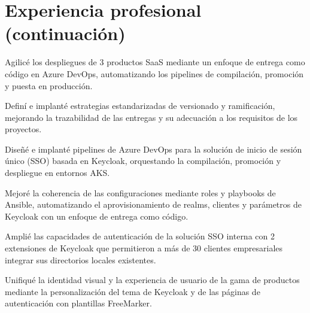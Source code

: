 \documentclass[11pt]{deedy-resume-openfont}
\begin{document}
\newpage
\section{Experiencia profesional (continuación)}
\sectionsepsmall
{}\hfill {}
\begin{tightemize}
\item Agilicé los despliegues de 3 productos SaaS mediante un enfoque de entrega como código en Azure DevOps, automatizando los pipelines de compilación, promoción y puesta en producción.
\item Definí e implanté estrategias estandarizadas de versionado y ramificación, mejorando la trazabilidad de las entregas y su adecuación a los requisitos de los proyectos.
\end{tightemize}
\sectionsep
{}
\sectionsep
{}\hfill {}
\begin{tightemize}
\item Diseñé e implanté pipelines de Azure DevOps para la solución de inicio de sesión único (SSO) basada en Keycloak, orquestando la compilación, promoción y despliegue en entornos AKS.
\item Mejoré la coherencia de las configuraciones mediante roles y playbooks de Ansible, automatizando el aprovisionamiento de realms, clientes y parámetros de Keycloak con un enfoque de entrega como código.
\item Amplié las capacidades de autenticación de la solución SSO interna con 2 extensiones de Keycloak que permitieron a más de 30 clientes empresariales integrar sus directorios locales existentes.
\item Unifiqué la identidad visual y la experiencia de usuario de la gama de productos mediante la personalización del tema de Keycloak y de las páginas de autenticación con plantillas FreeMarker.
\end{tightemize}
\sectionsep
{}

\vspace{0.5cm}
\end{document}
